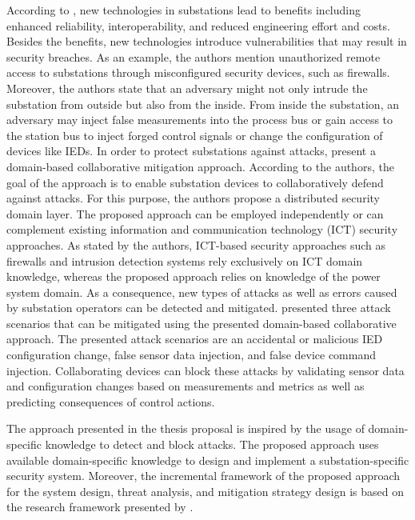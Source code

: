 According to \citeauthor{Hong2019} \cite{Hong2019}, new technologies in substations lead to benefits including enhanced reliability, interoperability, and reduced engineering effort and costs.
Besides the benefits, new technologies introduce vulnerabilities that may result in security breaches.
As an example, the authors mention unauthorized remote access to substations through misconfigured security devices, such as firewalls.
Moreover, the authors state that an adversary might not only intrude the substation from outside but also from the inside.
From inside the substation, an adversary may inject false measurements into the process bus or gain access to the station bus to inject forged control signals or change the configuration of devices like IEDs.
In order to protect substations against attacks, \citeauthor{Hong2019} present a domain-based collaborative mitigation approach.
According to the authors, the goal of the approach is to enable substation devices to collaboratively defend against attacks.
For this purpose, the authors propose a distributed security domain layer.
The proposed approach can be employed independently or can complement existing information and communication technology (ICT) security approaches.
As stated by the authors, ICT-based security approaches such as firewalls and intrusion detection systems rely exclusively on ICT domain knowledge, whereas the proposed approach relies on knowledge of the power system domain.
As a consequence, new types of attacks as well as errors caused by substation operators can be detected and mitigated.
\citeauthor{Hong2019} presented three attack scenarios that can be mitigated using the presented domain-based collaborative approach.
The presented attack scenarios are an accidental or malicious IED configuration change, false sensor data injection, and false device command injection.
Collaborating devices can block these attacks by validating sensor data and configuration changes based on measurements and metrics as well as predicting consequences of control actions.

The approach presented in the thesis proposal is inspired by the usage of domain-specific knowledge to detect and block attacks.
The proposed approach uses available domain-specific knowledge to design and implement a substation-specific security system.
Moreover, the incremental framework of the proposed approach for the system design, threat analysis, and mitigation strategy design is based on the research framework presented by \citeauthor{Hong2019}.

